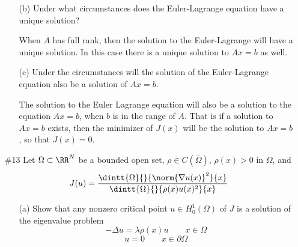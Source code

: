 \documentclass[11pt, oneside]{article}
\begin{document}
\begin{enumerate}
\begin{enumerate}
      \item[(b)]
        Under what circumstances does the Euler-Lagrange equation have a unique
        solution?

        When $A$ has full rank, then the solution to the Euler-Lagrange will
        have a unique solution.
        In this case there is a unique solution to $Ax = b$ as well.

      \item[(c)]
        Under the circumstances will the solution of the Euler-Lagrange equation
        also be a solution of $Ax = b$.

        The solution to the Euler Lagrange equation will also be a solution to
        the equation $Ax = b$, when $b$ is in the range of $A$.
        That is if a solution to $Ax = b$ exists, then the minimizer of $J(x)$
        will be the solution to $Ax = b$, so that $J(x) = 0$.
    \end{enumerate}

  \pagebreak
  \item[\#13] %
    Let $\Omega \subset \RR^N$ be a bounded open set,
    $\rho \in C(\overline{\Omega})$, $\rho(x) > 0$ in $\Omega$, and
    \[
      J(u) = \frac{\dintt{\Omega}{}{\norm{\nabla u(x)}^2}{x}}{\dintt{\Omega}{}{\rho(x)u(x)^2}{x}}
    \]
    \begin{enumerate}
      \item[(a)] %
        Show that any nonzero critical point $u \in H_0^1(\Omega)$ of $J$ is a
        solution of the eigenvalue problem
        \[
          -\Delta u = \lambda \rho(x) u \qquad x \in \Omega
        \]
        \[
          u = 0 \qquad x \in \partial \Omega
        \]


\end{enumerate}
\end{enumerate}
\end{document}
